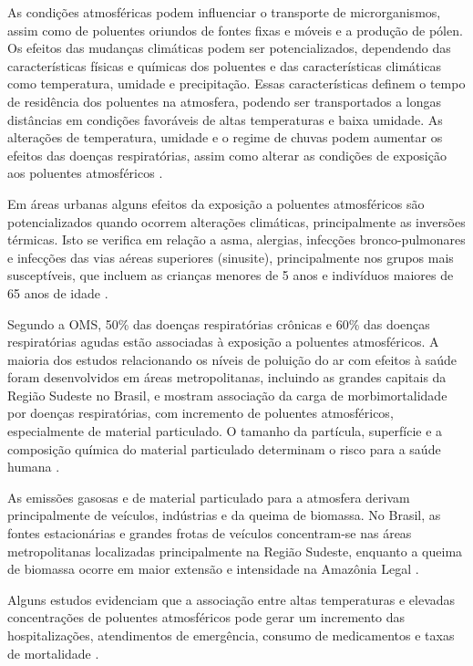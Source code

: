 \documentclass[journal]{IEEEtran}
\begin{document}
As  condições  atmosféricas  podem  influenciar  o  transporte  de  microrganismos,  assim  como  de  poluentes oriundos de fontes fixas e móveis e a produção de pólen. Os efeitos das mudanças climáticas podem ser potencializados, dependendo das características físicas e químicas dos poluentes e das características climáticas como temperatura, umidade e precipitação. Essas características definem o tempo de residência dos poluentes na atmosfera, podendo ser transportados a  longas  distâncias  em  condições  favoráveis  de  altas temperaturas  e  baixa  umidade.  As alterações de temperatura, umidade e o regime de chuvas podem aumentar os efeitos das doenças respiratórias, assim como alterar as condições de exposição aos poluentes atmosféricos  \cite{mudanças}.

Em áreas urbanas alguns efeitos da exposição a poluentes  atmosféricos  são  potencializados  quando  ocorrem alterações  climáticas,  principalmente  as  inversões  térmicas.  Isto  se  verifica  em  relação  a  asma,  alergias,  infecções bronco-pulmonares e infecções das vias aéreas superiores  (sinusite),  principalmente  nos  grupos  mais susceptíveis, que incluem as crianças menores de 5 anos e indivíduos maiores de 65 anos de idade \cite{mudanças}.

Segundo a OMS, 50\% das doenças respiratórias crônicas e 60\% das doenças respiratórias agudas estão associadas à exposição a poluentes atmosféricos. A maioria dos estudos relacionando os níveis de poluição do ar com efeitos à saúde foram desenvolvidos em áreas metropolitanas, incluindo  as  grandes  capitais  da  Região  Sudeste  no  Brasil,  e mostram associação da carga de morbimortalidade por doenças  respiratórias,  com  incremento  de  poluentes atmosféricos,  especialmente  de  material  particulado. O tamanho da partícula, superfície e a composição química do material particulado determinam o risco para a saúde humana \cite{mudanças}.

As emissões gasosas e de material particulado para a atmosfera derivam principalmente de veículos, indústrias e da queima de biomassa. No Brasil, as fontes estacionárias  e  grandes  frotas  de  veículos  concentram-se nas áreas metropolitanas localizadas principalmente na Região Sudeste, enquanto a queima de biomassa ocorre em maior extensão e intensidade na Amazônia Legal \cite{mudanças}.

Alguns estudos evidenciam que a associação entre altas temperaturas e elevadas concentrações de poluentes  atmosféricos  pode  gerar  um  incremento  das  hospitalizações,  atendimentos  de  emergência,  consumo de medicamentos e taxas de mortalidade \cite{mudanças}.
\end{document}
